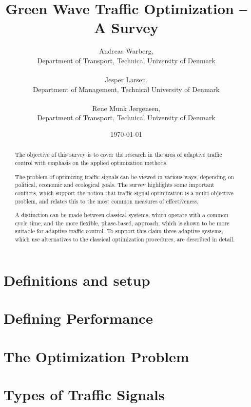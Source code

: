 \documentclass [a4paper, 10pt]{article}
\title{Green Wave Traffic Optimization -- A Survey}
\author{Andreas Warberg,\\ Department of Transport, Technical University of Denmark\\ ~ \\ 
Jesper Larsen,\\ Department of Management, Technical University of Denmark\\ ~ \\ Rene Munk J{\o}rgensen,\\ Department of Transport, Technical University of Denmark}
\date{\today}
\begin{document}
\setlength{\parindent}{4mm}

\maketitle

\begin{abstract}
The objective of this survey is to cover the research in the area of
adaptive traffic control with emphasis on the applied optimization
methods.

The problem of optimizing traffic signals can be viewed in various
ways, depending on political, economic and ecological goals. The survey
highlights some important conflicts, which support the notion that
traffic signal optimization is a multi-objective problem, and relates
this to the most common measures of effectiveness.

A distinction can be made between classical systems, which operate
with a common cycle time, and the more flexible, phase-based,
approach, which is shown to be more suitable for adaptive traffic
control. To support this claim three adaptive systems, which use
alternatives to the classical optimization procedures, are described
in detail.
\end{abstract}



\section{Definitions and setup}


%

\section{Defining Performance}


\section{The Optimization Problem}


\section{Types of Traffic Signals}

\end{document}
